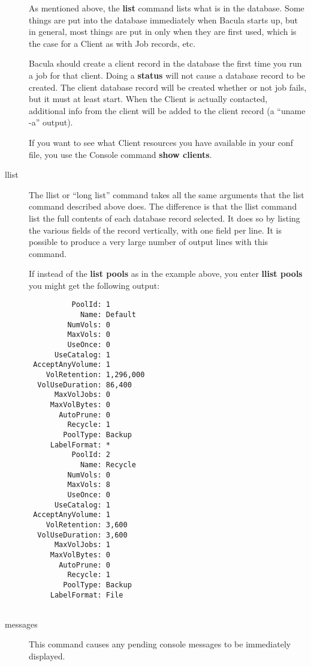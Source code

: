 \begin{description}
As mentioned above, the {\bf list} command lists what is in the  database.
Some things are put into the database immediately when  Bacula starts up, but
in general, most things are put in only when  they are first used, which is
the case for a Client as with Job  records, etc.  

Bacula should create a client record in the database the first  time you run a
job for that client. Doing a {\bf status} will not  cause a database record to
be created. The client database record  will be created whether or not job
fails, but it must at least  start. When the Client is actually contacted,
additional info  from the client will be added to the client record (a ``uname
-a''  output).  

If you want to see what Client resources you have available in  your conf
file, you use the Console command {\bf show clients}.  

\item [llist]
   The llist or ``long list'' command takes  all the same arguments that the list
command described above does.  The difference is that the llist command list
the full contents  of each database record selected. It does so by listing the
various fields of the record vertically, with one field per  line. It is
possible to produce a very large number of output  lines with this command.  

If instead of the {\bf list pools} as in the example above,  you enter {\bf
llist pools} you might get the following output:  

\footnotesize
\begin{verbatim}
          PoolId: 1
            Name: Default
         NumVols: 0
         MaxVols: 0
         UseOnce: 0
      UseCatalog: 1
 AcceptAnyVolume: 1
    VolRetention: 1,296,000
  VolUseDuration: 86,400
      MaxVolJobs: 0
     MaxVolBytes: 0
       AutoPrune: 0
         Recycle: 1
        PoolType: Backup
     LabelFormat: *
          PoolId: 2
            Name: Recycle
         NumVols: 0
         MaxVols: 8
         UseOnce: 0
      UseCatalog: 1
 AcceptAnyVolume: 1
    VolRetention: 3,600
  VolUseDuration: 3,600
      MaxVolJobs: 1
     MaxVolBytes: 0
       AutoPrune: 0
         Recycle: 1
        PoolType: Backup
     LabelFormat: File
      
\end{verbatim}
\normalsize

\item [messages]
   This command causes any pending  console messages to be immediately displayed.
 


\end{description}
